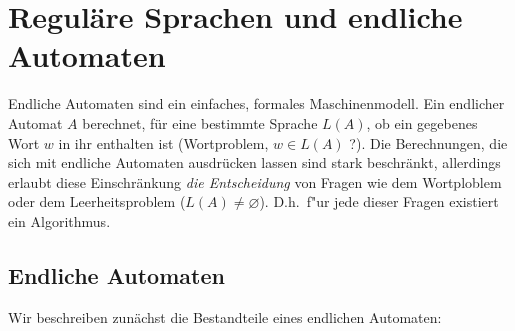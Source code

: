\section[Reguläre Sprachen und endliche Automaten]{Reguläre Sprachen und endliche Automaten}
Endliche Automaten sind ein einfaches, formales Maschinenmodell.
Ein endlicher Automat $A$ berechnet, für eine bestimmte Sprache $L(A)$, ob ein gegebenes Wort $w$ in ihr enthalten ist (Wortproblem, $w \in L(A)$ ?).
Die Berechnungen, die sich mit endliche Automaten ausdrücken lassen sind stark beschränkt, allerdings erlaubt diese Einschränkung \emph{die Entscheidung} von Fragen wie dem Wortploblem oder dem Leerheitsproblem ($L(A)\neq\varnothing$).
D.h.\ f"ur jede dieser Fragen existiert ein Algorithmus.

\subsection{Endliche Automaten}
Wir beschreiben zunächst die Bestandteile eines endlichen Automaten:


